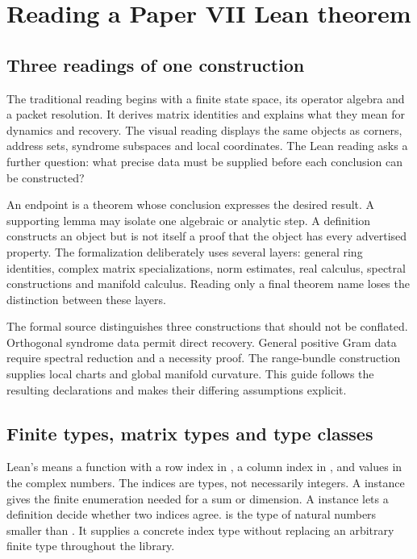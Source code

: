 \section{Reading a Paper VII Lean theorem}
\label{sec:reading}

\subsection{Three readings of one construction}
The traditional reading begins with a finite state space, its operator algebra and a packet resolution. It derives matrix identities and explains what they mean for dynamics and recovery. The visual reading displays the same objects as corners, address sets, syndrome subspaces and local coordinates. The Lean reading asks a further question: what precise data must be supplied before each conclusion can be constructed?

An endpoint is a theorem whose conclusion expresses the desired result. A supporting lemma may isolate one algebraic or analytic step. A definition constructs an object but is not itself a proof that the object has every advertised property. The formalization deliberately uses several layers: general ring identities, complex matrix specializations, norm estimates, real calculus, spectral constructions and manifold calculus. Reading only a final theorem name loses the distinction between these layers.

The formal source distinguishes three constructions that should not be conflated. Orthogonal syndrome data permit direct recovery. General positive Gram data require spectral reduction and a necessity proof. The range-bundle construction supplies local charts and global manifold curvature. This guide follows the resulting declarations and makes their differing assumptions explicit.

\subsection{Finite types, matrix types and type classes}
Lean's  means a function with a row index in , a column index in , and values in the complex numbers. The indices are types, not necessarily integers. A  instance gives the finite enumeration needed for a sum or dimension. A  instance lets a definition decide whether two indices agree.  is the type of natural numbers smaller than . It supplies a concrete index type without replacing an arbitrary finite type throughout the library.

